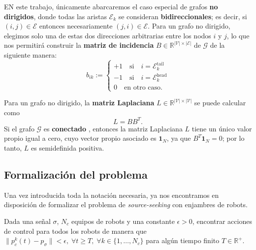 EN este trabajo, únicamente abarcaremos el caso especial de grafos \textbf{no dirigidos}, donde todas las aristas $\mathcal{E}_k$ se consideran \textbf{bidireccionales}; es decir, si $(i,j)\in\mathcal{E}$ entonces necesariamente $(j,i)\in\mathcal{E}$. Para un grafo no dirigido, elegimos solo una de estas dos direcciones arbitrarias entre los nodos $i$ y $j$, lo que nos permitirá construir la \textbf{matriz de incidencia} $B\in\mathbb{R}^{|\mathcal{V}|\times |\mathcal{E}|}$ de $\mathcal{G}$ de la siguiente manera:
\begin{equation}
	b_{ik} := \begin{cases}+1 \quad \text{si} \quad i = {\mathcal{E}_k^{\text{tail}}} \\
		-1 \quad \text{si} \quad i = {\mathcal{E}_k^{\text{head}}} \\
		0 \quad \text{en otro caso.}
	\end{cases}
	\label{eq: B}
\end{equation}

Para un grafo no dirigido, la \textbf{matriz Laplaciana} $L\in\mathbb{R}^{|\mathcal{V}|\times |\mathcal{V}|}$ \cite[Capítulo 6]{bullo2020lectures} se puede calcular como
\begin{equation}
L = BB^T.
\label{eq: L}
\end{equation}
Si el grafo $\mathcal{G}$ es \textbf{conectado} \cite[Capítulo 3]{bullo2020lectures}, entonces la matriz Laplaciana $L$ tiene un único valor propio igual a cero, cuyo vector propio asociado es $\mathbf{1}_N$, ya que $B^T\mathbf{1}_N = 0$; por lo tanto, $L$ es semidefinida positiva.

\subsection{Formalización del problema}

Una vez introducida toda la notación necesaria, ya nos encontramos en disposición de formalizar el problema de \textit{source-seeking} con enjambres de robots.

\begin{problema} \label{problema: ss}
Dada una señal $\sigma$, $N_c$ equipos de robots y una constante $\epsilon > 0$, encontrar acciones de control para todos los robots de manera que $\|p_c^k(t) - p_\sigma\| < \epsilon, \; \forall t \geq T, \; \forall k\in \{1,\dots,N_c\}$ para algún tiempo finito $T\in\mathds{R}^+$.
\end{problema}


